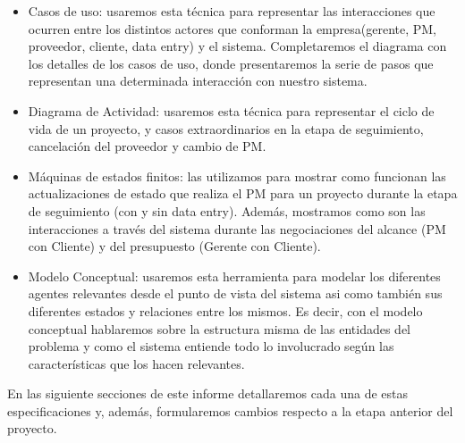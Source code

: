  \begin{itemize}
  \item Casos de uso: usaremos esta técnica para representar las interacciones que ocurren entre los distintos
  actores que conforman la empresa(gerente, PM, proveedor, cliente, data entry) y el sistema. Completaremos
  el diagrama con los detalles de los casos de uso, donde presentaremos la serie de pasos que representan una
  determinada interacción con nuestro sistema.
  \item Diagrama de Actividad: usaremos esta técnica para representar el ciclo de vida de un proyecto, y casos extraordinarios en la etapa de seguimiento, cancelación del proveedor y cambio de PM.
  \item Máquinas de estados finitos: las utilizamos para mostrar como funcionan las actualizaciones de estado que realiza el PM para un proyecto
  durante la etapa de seguimiento (con y sin data entry). Además, mostramos como son las interacciones a través del sistema durante las negociaciones
  del alcance (PM con Cliente) y del presupuesto (Gerente con Cliente).
  \item Modelo Conceptual: usaremos esta herramienta para modelar los diferentes agentes relevantes desde el punto de vista del sistema asi como también sus diferentes estados y relaciones entre los mismos. Es decir, con el modelo conceptual hablaremos sobre la estructura misma de las entidades del problema y como el sistema entiende todo lo involucrado según las características que los hacen relevantes.
 \end{itemize}

En las siguiente secciones de este informe detallaremos cada una de estas especificaciones y, además, formularemos cambios respecto a la etapa anterior del
proyecto. 
